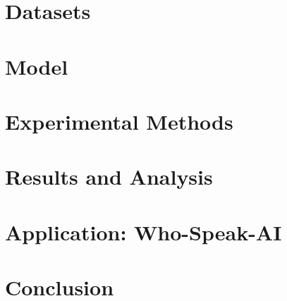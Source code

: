 \documentclass[a4paper,11pt,oneside]{article}
\DeclareRobustCommand{\_}{%
  \ifmmode
    \text{\textunderscore}\allowbreak
  \else
    \textunderscore\allowbreak
  \fi
}
\begin{document}

\section{Datasets}\label{sec:datasets}


\section{Model}\label{sec:model}


\section{Experimental Methods}\label{sec:methods}


\section{Results and Analysis}\label{sec:results}


\section{Application: Who-Speak-AI}\label{sec:application}


\section{Conclusion}\label{sec:conclusion}


\nocite{*}

{}

\end{document}
